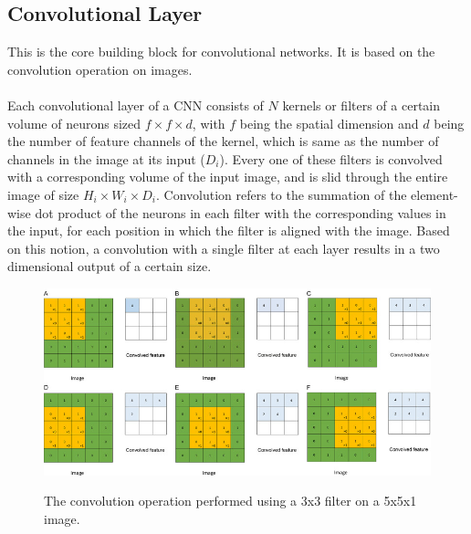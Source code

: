 \documentclass[12pt, a4paper]{report}
\begin{document}
\subsection{Convolutional Layer}
This is the core building block for convolutional networks. It is based on the convolution operation on images.
\paragraph{}
Each convolutional layer of a CNN consists of $N$ kernels or filters of a certain volume of neurons sized $f \times f \times d$, with $f$ being the spatial dimension and $d$ being the number of feature channels of the kernel, which is same as the number of channels in the image at its input ($D_{i}$). Every one of these filters is convolved with a corresponding volume of the input image, and is slid through the entire image of size $H_{i} \times W_{i} \times D_{i}$. Convolution refers to the summation of the element-wise dot product of the neurons in each filter with the corresponding values in the input, for each position in which the filter is aligned with the image. Based on this notion, a convolution with a single filter at each layer results in a two dimensional output of a certain size. \cite{cs231n, muruganandham2016semantic, dlai4}
\begin{figure}[h]
\centering
\includegraphics[width=\textwidth]{cnn1.jpg}
\caption{The convolution operation performed using a 3x3 filter on a 5x5x1 image.}\cite{fathi2018deep}
\end{figure}
\end{document}
